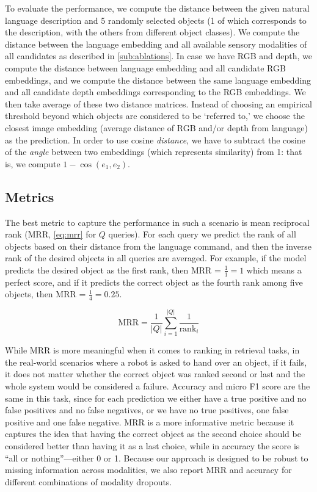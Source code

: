 \documentclass[10pt]{article} %
\begin{document}
To evaluate the performance, we compute the distance between the given natural language description and 5 randomly selected objects (1 of which corresponds to the description, with the others from different object classes). We compute the distance between the language embedding and all available sensory modalities of all candidates as described in \cref{sub:ablations}. In case we have RGB and depth, we compute the distance between language embedding and all candidate RGB embeddings, and we compute the distance between the same language embedding and all candidate depth embeddings corresponding to the RGB embeddings. We then take average of these two distance matrices. Instead of choosing an empirical threshold beyond which objects are considered to be `referred to,' we choose the closest image embedding (average distance of RGB and/or depth from language) as the prediction.
In order to use cosine \textit{distance}, we have to subtract the cosine of the \textit{angle} between two embeddings (which represents similarity) from 1: that is, we compute $1 - \cos(e_1, e_2)$.

\subsection{Metrics}
\label{sec:metrics}
The best metric to capture the performance in such a scenario is mean reciprocal rank (MRR, \cref{eq:mrr} for $Q$ queries). For each query we predict the rank of all objects based on their distance from the language command, and then the inverse rank of the desired objects in all queries are averaged. For example, if the model predicts the desired object as the first rank, then MRR = $\frac{1}{1} = 1$ which means a perfect score, and if it predicts the correct object as the fourth rank among five objects, then MRR = $\frac{1}{4}=0.25$. 

\begin{equation} \label{eq:mrr}
    \mathrm{MRR}=\frac{1}{|Q|} \sum_{i=1}^{|Q|} \frac{1}{\operatorname{rank}_{i}}
\end{equation}

While MRR is more meaningful when it comes to ranking in retrieval tasks, in the real-world scenarios where a robot is asked to hand over an object, if it fails, it does not matter whether the correct object was ranked second or last and the whole system would be considered a failure.
Accuracy and micro F1 score
are the same in this task, since for each prediction we either have a true positive and no false positives and no false negatives, or we have no true positives, one false positive and one false negative. MRR is a more informative metric because it captures the idea that having the correct object as the second choice should be considered better than having it as a last choice, while in accuracy the score is ``all or nothing''---either 0 or 1. Because our approach is designed to be robust to missing information across modalities, we also report MRR and accuracy for different combinations of modality dropouts. 
\end{document}
